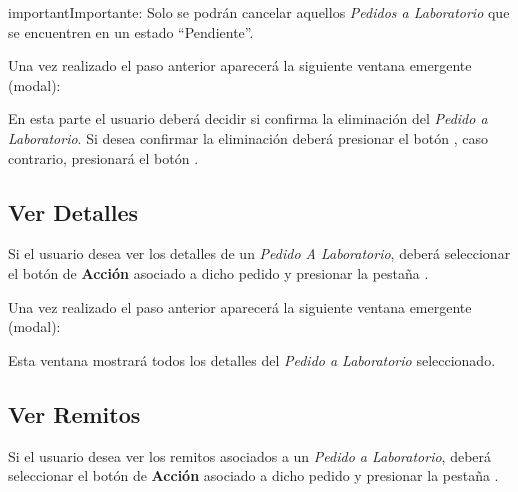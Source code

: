 \documentclass[a4paper,10pt,spanish]{sphinxmanual}
\begin{document}
\begin{notice}{important}{Importante:}
Solo se podrán cancelar aquellos \emph{Pedidos a Laboratorio} que se encuentren en un estado “Pendiente”.
\end{notice}


Una vez realizado el paso anterior aparecerá la siguiente ventana emergente (modal):


En esta parte el usuario deberá decidir si confirma la eliminación del \emph{Pedido a Laboratorio}. Si desea confirmar la eliminación deberá presionar el botón , caso contrario, presionará el botón .


\subsection{Ver Detalles}
\label{pedidosalab:ver-detalles}\label{pedidosalab:ver-detalles-pl}
Si el usuario desea ver los detalles de un \emph{Pedido A Laboratorio}, deberá seleccionar el botón de \textbf{Acción} asociado a dicho pedido y presionar la pestaña .


Una vez realizado el paso anterior aparecerá la siguiente ventana emergente (modal):


Esta ventana mostrará todos los detalles del \emph{Pedido a Laboratorio} seleccionado.


\subsection{Ver Remitos}
\label{pedidosalab:ver-remitos}\label{pedidosalab:ver-remitos-pl}
Si el usuario desea ver los remitos asociados a un \emph{Pedido a Laboratorio}, deberá seleccionar el botón de \textbf{Acción} asociado a dicho pedido y presionar la pestaña .
\end{document}
